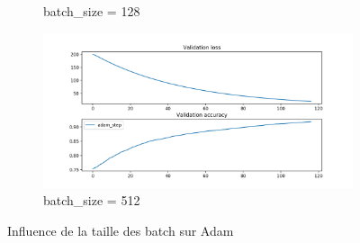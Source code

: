 \documentclass[fleqn,11pt, titlepage, french]{article}
\begin{document}
\begin{figure}[H]
\begin{subfigure}{0.45\textwidth}
			\caption{batch\_size = 128}
		\end{subfigure}
		\begin{subfigure}{0.45\textwidth}
			\centering
			\includegraphics[scale=0.25]{../gdsvm/exports/mnist-batch512-adam_step.png}
			\caption{batch\_size = 512}
		\end{subfigure}
		
		\caption{Influence de la taille des batch sur Adam}
	\end{figure}
\end{document}
